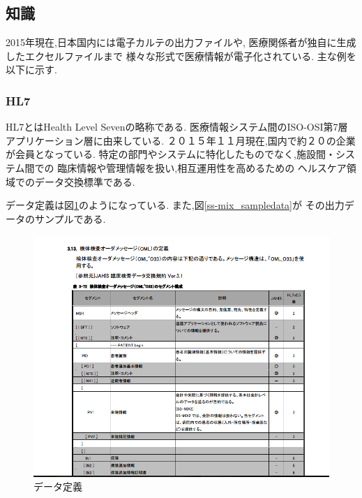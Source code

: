 \subsection{知識}
  2015年現在,日本国内には電子カルテの出力ファイルや,
  医療関係者が独自に生成したエクセルファイルまで
  様々な形式で医療情報が電子化されている.
  主な例を以下に示す.

  \subsubsection{HL7 \cite{bibi5} \cite{bibi6} }
  HL7とはHealth Level Sevenの略称である.
  医療情報システム間のISO-OSI第7層アプリケーション層に由来している.
  ２０１５年１１月現在,国内で約２０の企業が会員となっている.
  特定の部門やシステムに特化したものでなく,施設間・システム間での
  臨床情報や管理情報を扱い,相互運用性を高めるための
  ヘルスケア領域でのデータ交換標準である.

  データ定義は図\ref{ss-mix_sample}のようになっている.
  また,図\ref{ss-mix_sampledata}が
  その出力データのサンプルである.

	\begin{figure}[htbp]
    \begin{center}
			\includegraphics[width=12cm, bb=0 0 792 630]{./gazou/ss-mix_sample.png} %
    \end{center}
    \caption{データ定義}
		\label{ss-mix_sample}
	\end{figure}

